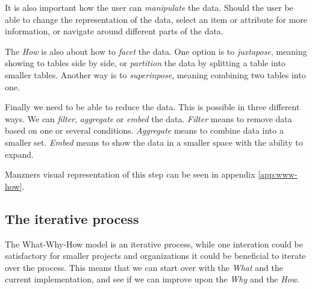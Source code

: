 It is also important how the user can \textit{manipulate} the data. Should the user be able 
to change the representation of the data, select an item or attribute for more information, or 
navigate around different parts of the data. 

The \textit{How} is also about how to \textit{facet} the data. One option is to 
\textit{juxtapose}, meaning showing to tables side by side, or \textit{partition} the data by splitting
a table into smaller tables.
Another way is to \textit{superinpose}, meaning combining two tables into one.

Finally we need to be able to reduce the data. This is possible in three different ways.
We can \textit{filter}, \textit{aggregate} or \textit{embed} the data.
\textit{Filter} means to remove data based on one or several conditions. 
\textit{Aggregate} means to combine data into a smaller set.
\textit{Embed} means to show the data in a smaller space with the ability to expand.

Manzners visual representation of this step can be seen in appendix \ref{app:www-how}.

\subsection{The iterative process}

The What-Why-How model is an iterative process, while one interation could be satisfactory for 
smaller projects and organizations it could be beneficial to iterate over the process.
This means that we can start over with the \textit{What} and the current implementation, and 
see if we can improve upon the \textit{Why} and the \textit{How}.
